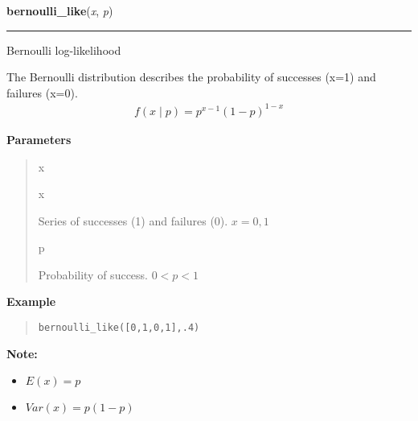     \begin{boxedminipage}{\textwidth}

    \raggedright \textbf{bernoulli\_like}(\textit{x}, \textit{p})

    \vspace{-1.5ex}

    \rule{\textwidth}{0.5\fboxrule}

Bernoulli log-likelihood

The Bernoulli distribution describes the probability of successes (x=1) and
failures (x=0).
\begin{equation*}\begin{split}f(x \mid p) = p^{x- 1} (1-p)^{1-x}\end{split}\end{equation*}    \vspace{1ex}

      \textbf{Parameters}
      \begin{quote}
        \begin{Ventry}{x}

          \item[x]


Series of successes (1) and failures (0). $x=0,1$
          \item[p]


Probability of success. $0 < p < 1$
        \end{Ventry}

      \end{quote}

    \vspace{1ex}

      \textbf{Example}
      \begin{quote}
          \begin{alltt}
\pysrcprompt{{\textgreater}{\textgreater}{\textgreater} }bernoulli\_like([0,1,0,1], .4)
\end{alltt}
      \end{quote}

    \vspace{1ex}

\textbf{Note:} \begin{itemize}
\item {} 
$E(x)= p$

\item {} 
$Var(x)= p(1-p)$

\end{itemize}


    \end{boxedminipage}

